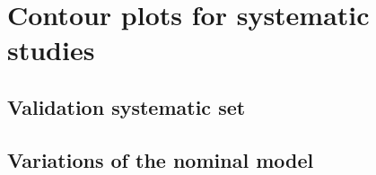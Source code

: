 \clearpage
\chapter{Contour plots for systematic studies}
\label{cha:contours}

\section{Validation systematic set}

\begin{figure}
	\centering
	\resizebox{0.24\linewidth}{!}{}
	\resizebox{0.24\linewidth}{!}{}
	\resizebox{0.24\linewidth}{!}{}
	\resizebox{0.24\linewidth}{!}{}

	   \hspace{0.24\linewidth}
	\resizebox{0.24\linewidth}{!}{}
	\resizebox{0.24\linewidth}{!}{}
	\resizebox{0.24\linewidth}{!}{}

	   \hspace{0.24\linewidth}
	   \hspace{0.24\linewidth}
	\resizebox{0.24\linewidth}{!}{}
	\resizebox{0.24\linewidth}{!}{}

	   \hspace{0.24\linewidth}
	   \hspace{0.24\linewidth}
	   \hspace{0.24\linewidth}
	\resizebox{0.24\linewidth}{!}{}
\end{figure}

\section{Variations of the nominal model}
